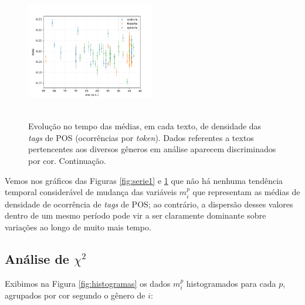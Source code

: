 \documentclass[10pt,a4paper,onecolumn]{article}
\theoremstyle{definition}
\theoremstyle{remark}
\begin{document}
\begin{figure}[htpb!]
\begin{multicols}{2}
	\end{multicols}%
	\includegraphics[width=0.5\textwidth]{graficos/VERB_no_tempo.png} \\  \\ \vspace{0.5cm}
	\caption{Evolução no tempo das médias, em cada texto, de densidade das \emph{tags} de POS (ocorrências por \emph{token}). Dados referentes a textos pertencentes aos diversos gêneros em análise aparecem discriminados por cor. Continuação.}
	\label{fig:serie2}
\end{figure}

Vemos nos gráficos das Figuras \ref{fig:serie1} e \ref{fig:serie2} que não há nenhuma tendência temporal considerável de mudança das variáveis $m^p_i$ que representam as médias de densidade de ocorrência de \emph{tags} de POS; ao contrário, a dispersão desses valores dentro de um mesmo período pode vir a ser claramente dominante sobre variações ao longo de muito mais tempo.

\subsection{Análise de $\chi^2$}
Exibimos na Figura \ref{fig:histogramas} os dados $m^p_i$ histogramados para cada $p$, agrupados por cor segundo o gênero de $i$:
\end{document}
